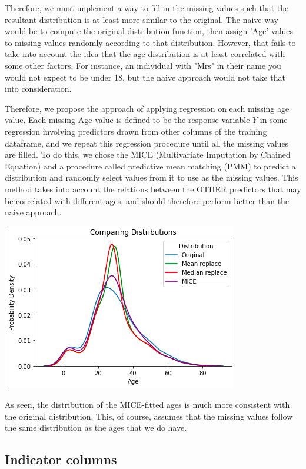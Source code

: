\documentclass[12pt]{article}
\begin{document}
Therefore, we must implement a way to fill in the missing values such that the resultant distribution is at least more similar to the original. The naive way would be to compute the original distribution function, then assign 'Age' values to missing values randomly according to that distribution. However, that fails to take into account the idea that the age distribution is at least correlated with some other factors. For instance, an individual with "Mrs" in their name you would not expect to be under 18, but the naive approach would not take that into consideration.\newline

Therefore, we propose the approach of applying regression on each missing age value. Each missing Age value is defined to be the response variable $Y$ in some regression involving predictors drawn from other columns of the training dataframe, and we repeat this regression procedure until all the missing values are filled. To do this, we chose the MICE (Multivariate Imputation by Chained Equation) and a procedure called predictive mean matching (PMM) to predict a distribution and randomly select values from it to use as the missing values. This method takes into account the relations between the OTHER predictors that may be correlated with different ages, and should therefore perform better than the naive approach.\newline

\includegraphics[scale=0.6]{mice_age_distributions}

As seen, the distribution of the MICE-fitted ages is much more consistent with the original distribution. This, of course, assumes that the missing values follow the same distribution as the ages that we do have.\newline


\subsection{Indicator columns}
\end{document}
